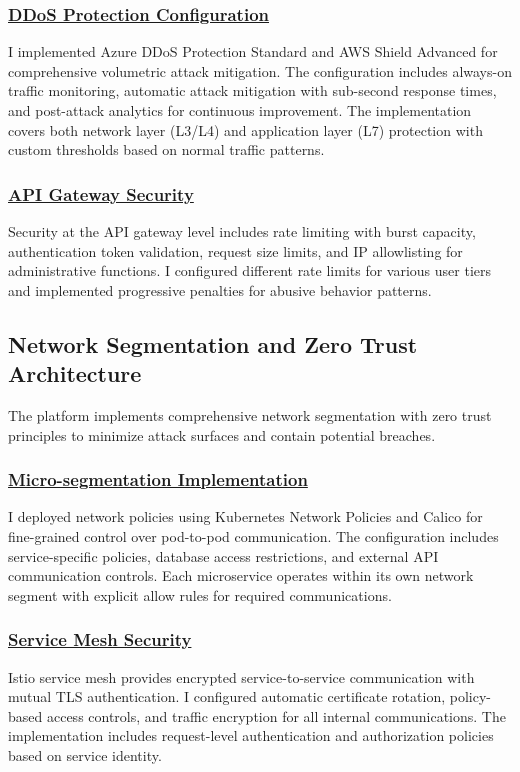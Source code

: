 \subsubsection*{\underline{DDoS Protection Configuration}}
I implemented Azure DDoS Protection Standard and AWS Shield Advanced for comprehensive volumetric attack mitigation. The configuration includes always-on traffic monitoring, automatic attack mitigation with sub-second response times, and post-attack analytics for continuous improvement. The implementation covers both network layer (L3/L4) and application layer (L7) protection with custom thresholds based on normal traffic patterns.

\subsubsection*{\underline{API Gateway Security}}
Security at the API gateway level includes rate limiting with burst capacity, authentication token validation, request size limits, and IP allowlisting for administrative functions. I configured different rate limits for various user tiers and implemented progressive penalties for abusive behavior patterns.

\subsection{Network Segmentation and Zero Trust Architecture}
The platform implements comprehensive network segmentation with zero trust principles to minimize attack surfaces and contain potential breaches.

\subsubsection*{\underline{Micro-segmentation Implementation}}
I deployed network policies using Kubernetes Network Policies and Calico for fine-grained control over pod-to-pod communication. The configuration includes service-specific policies, database access restrictions, and external API communication controls. Each microservice operates within its own network segment with explicit allow rules for required communications.

\subsubsection*{\underline{Service Mesh Security}}
Istio service mesh provides encrypted service-to-service communication with mutual TLS authentication. I configured automatic certificate rotation, policy-based access controls, and traffic encryption for all internal communications. The implementation includes request-level authentication and authorization policies based on service identity.

